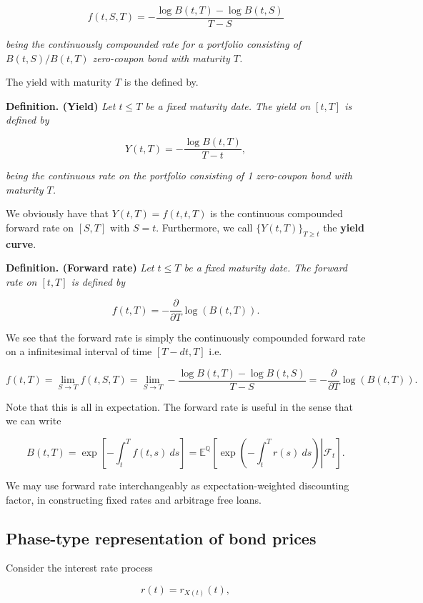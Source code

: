 \documentclass[a4paper,12pt,openany]{book}
\begin{document}
\[
f(t,S,T)=-\frac{\log B(t,T)-\log B(t,S)}{T-S}
\]

\emph{being the continuously compounded rate for a portfolio consisting of \(B(t,S)/B(t,T)\) zero-coupon bond with maturity \(T\).}

The yield with maturity \(T\) is the defined by.

\textbf{Definition. (Yield)} \emph{Let \(t\le T\) be a fixed maturity date. The yield on \([t,T]\) is defined by}

\[
Y(t,T)=-\frac{\log B(t,T)}{T-t},
\]

\emph{being the continuous rate on the portfolio consisting of 1 zero-coupon bond with maturity \(T\).}

We obviously have that \(Y(t,T)=f(t,t,T)\) is the continuous compounded forward rate on \([S,T]\) with \(S=t\). Furthermore, we call \(\{Y(t,T)\}_{T\ge t}\) the \textbf{yield curve}.

\textbf{Definition. (Forward rate)} \emph{Let \(t\le T\) be a fixed maturity date. The forward rate on \([t,T]\) is defined by}

\[
f(t,T)=-\frac{\partial}{\partial T}\log(B(t,T)).
\]

We see that the forward rate is simply the continuously compounded forward rate on a infinitesimal interval of time \([T-d t,T]\) i.e.

\[
f(t,T)=\lim_{S\to T}f(t,S,T)=\lim_{S\to T}-\frac{\log B(t,T)-\log B(t,S)}{T-S}=-\frac{\partial}{\partial T}\log(B(t,T)).
\]

Note that this is all in expectation. The forward rate is useful in the sense that we can write

\[
B(t,T)=\exp\left[-\int_t^T f(t,s)\ ds\right]=\mathbb E^{\mathbb Q}\left[\left.\exp\left(-\int_t^T r(s)\ ds\right) \right\vert \mathcal{F}_t\right].
\]

We may use forward rate interchangeably as expectation-weighted discounting factor, in constructing fixed rates and arbitrage free loans.

\hypertarget{phase-type-representation-of-bond-prices}{%
\subsection{Phase-type representation of bond prices}\label{phase-type-representation-of-bond-prices}}

Consider the interest rate process

\[
r(t)=r_{X(t)}(t),
\]
\end{document}
